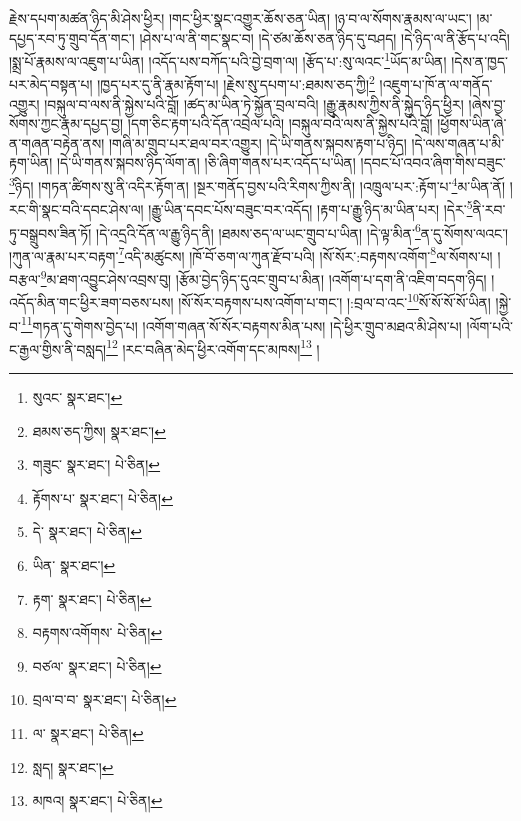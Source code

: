 རྗེས་དཔག་མཚན་ཉིད་མི་ཤེས་ཕྱིར། །གང་ཕྱིར་སྣང་འགྱུར་ཆོས་ཅན་ཡིན། །ཉ་བ་ལ་སོགས་རྣམས་ལ་ཡང་། །མ་དཔྱད་རབ་ཏུ་གྲུབ་དོན་གང་། །ཤེས་པ་ལ་ནི་གང་སྣང་བ། །དེ་ཙམ་ཆོས་ཅན་ཉིད་དུ་བཤད། །དེ་ཉིད་ལ་ནི་རྩོད་པ་འདི། །སྨྲ་པོ་རྣམས་ལ་འཇུག་པ་ཡིན། །འདོད་པས་བཀོད་པའི་བྱེ་བྲག་ལ། །རྩོད་པ་:སུ་ལའང་\footnote{སུའང་  སྣར་ཐང་། }ཡོད་མ་ཡིན། །དེས་ན་ཁྱད་པར་མེད་བསྟན་པ། །ཁྱད་པར་དུ་ནི་རྣམ་རྟོག་པ། །རྗེས་སུ་དཔག་པ་:ཐམས་ཅད་ཀྱི།\footnote{ཐམས་ཅད་ཀྱིས།  སྣར་ཐང་། } །འཇུག་པ་ཁོ་ན་ལ་གནོད་འགྱུར། །བསྐུལ་བ་ལས་ནི་སྐྱེས་པའི་བློ། །ཚད་མ་ཡིན་ཏེ་སྐྱོན་བྲལ་བའི། །རྒྱུ་རྣམས་ཀྱིས་ནི་སྐྱེད་ཉིད་ཕྱིར། །ཞེས་བྱ་སོགས་ཀྱང་རྣམ་དཔྱད་བྱ། །དག་ཅིང་རྟག་པའི་དོན་འབྲེལ་པའི། །བསྐུལ་བའི་ལས་ནི་སྐྱེས་པའི་བློ། །ཕྱོགས་ཡིན་ཞེ་ན་གཞན་བརྟེན་ནས། །གཞི་མ་གྲུབ་པར་ཐལ་བར་འགྱུར། །དེ་ཡི་གནས་སྐབས་རྟག་པ་ཉིད། །དེ་ལས་གཞན་པ་མི་རྟག་ཡིན། །དེ་ཡི་གནས་སྐབས་ཉིད་ལོག་ན། །ཅི་ཞིག་གནས་པར་འདོད་པ་ཡིན། །དབང་པོ་འབའ་ཞིག་གིས་བཟུང་\footnote{གཟུང་  སྣར་ཐང་།  པེ་ཅིན། }ཉིད། །གཏན་ཚིགས་སུ་ནི་འདིར་རྟོག་ན། །སྔར་གནོད་བྱས་པའི་རིགས་ཀྱིས་ནི། །འཁྲུལ་པར་:རྟོག་པ་\footnote{རྟོགས་པ་  སྣར་ཐང་།  པེ་ཅིན། }མ་ཡིན་ནོ། །རང་གི་སྣང་བའི་དབང་ཤེས་ལ། །རྒྱུ་ཡིན་དབང་པོས་བཟུང་བར་འདོད། །རྟག་པ་རྒྱུ་ཉིད་མ་ཡིན་པར། །དེར་\footnote{དེ་  སྣར་ཐང་།  པེ་ཅིན། }ནི་རབ་ཏུ་བསྒྲུབས་ཟིན་ཏོ། །དེ་འདྲའི་དོན་ལ་རྒྱུ་ཉིད་ནི། །ཐམས་ཅད་ལ་ཡང་གྲུབ་པ་ཡིན། །དེ་ལྟ་མིན་\footnote{ཡིན་  སྣར་ཐང་། }ན་དུ་སོགས་ལའང་། །ཀུན་ལ་རྣམ་པར་བརྟག་\footnote{རྟག་  སྣར་ཐང་།  པེ་ཅིན། }འདི་མཚུངས། །ཁོ་བོ་ཅག་ལ་ཀུན་རྫོབ་པའི། །སོ་སོར་:བརྟགས་འགོག་\footnote{བརྟགས་འགོགས་  པེ་ཅིན། }ལ་སོགས་པ། །བརྩལ་\footnote{བཙལ་  སྣར་ཐང་།  པེ་ཅིན། }མ་ཐག་འབྱུང་ཤེས་འབྲས་བུ། །རྩོམ་བྱེད་ཉིད་དུའང་གྲུབ་པ་མིན། །འགོག་པ་དག་ནི་འཇིག་བདག་ཉིད། །འདོད་མིན་གང་ཕྱིར་ཟག་བཅས་པས། །སོ་སོར་བརྟགས་པས་འགོག་པ་གང་། །:བྲལ་བ་འང་\footnote{བྲལ་བ་བ་  སྣར་ཐང་།  པེ་ཅིན། }སོ་སོ་སོ་སོ་ཡིན། །སྐྱེ་བ་\footnote{ལ་  སྣར་ཐང་།  པེ་ཅིན། }གཏན་དུ་གེགས་བྱེད་པ། །འགོག་གཞན་སོ་སོར་བརྟགས་མིན་པས། །དེ་ཕྱིར་གྲུབ་མཐའ་མི་ཤེས་པ། །ལོག་པའི་ང་རྒྱལ་གྱིས་ནི་བསླད།\footnote{སླད།  སྣར་ཐང་། } །རང་བཞིན་མེད་ཕྱིར་འགོག་དང་མཁས།\footnote{མཁའ།  སྣར་ཐང་།  པེ་ཅིན། } །
